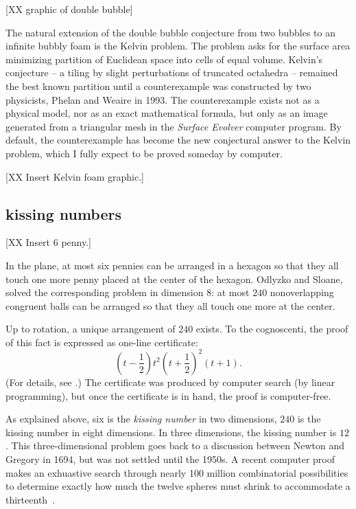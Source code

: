 \documentclass{llncs}
\begin{document}
[XX graphic of double bubble]


The natural extension of the double bubble conjecture from two bubbles to an infinite
bubbly foam is the Kelvin problem.  The problem asks for the surface area minimizing
partition of Euclidean space into cells of equal volume.  Kelvin's conjecture --
a tiling by slight perturbations of truncated octahedra -- remained the best known partition
until a counterexample was constructed by two physicists, Phelan and Weaire in 1993.
The counterexample exists not as a physical model, nor as an exact mathematical formula, but
only as an image generated from a triangular mesh in the {\it Surface Evolver} computer
program.  By default, the counterexample has become the new conjectural answer to the
Kelvin problem, which  I fully expect to be proved someday by computer.

[XX Insert Kelvin foam graphic.]



\subsection{kissing numbers} %

[XX Insert 6 penny.]

In the plane, at most six pennies can be arranged in a hexagon so that they
all touch one more penny placed at the center of the hexagon.  Odlyzko
and Sloane, solved the corresponding problem in dimension $8$: at most
$240$ nonoverlapping congruent balls can be arranged so that they all
touch one more at the center.  

 Up to rotation, a unique arrangement of
$240$ exists.  To the cognoscenti, the proof of this fact is expressed as one-line certificate:
\[
(t - \frac{1}{2})t^2(t + \frac{1}{2})^2 (t + 1).
\]
(For details, see \cite{PZ}.)
The certificate was produced by computer search (by linear programming), but once
the certificate is in hand, the proof is computer-free.

As explained above, six is the {\it kissing number} in two dimensions,
$240$ is the kissing number in eight dimensions. In three dimensions,
the kissing number is $12$.  This three-dimensional problem goes back
to a discussion between Newton and Gregory in 1694, but was not
settled until the 1950s.  A recent computer proof makes an exhuastive
search through nearly 100 million combinatorial possibilities to
determine exactly how much the twelve spheres must shrink to
accommodate a thirteenth~\cite{Musin-Tarasov}.
\end{document}
